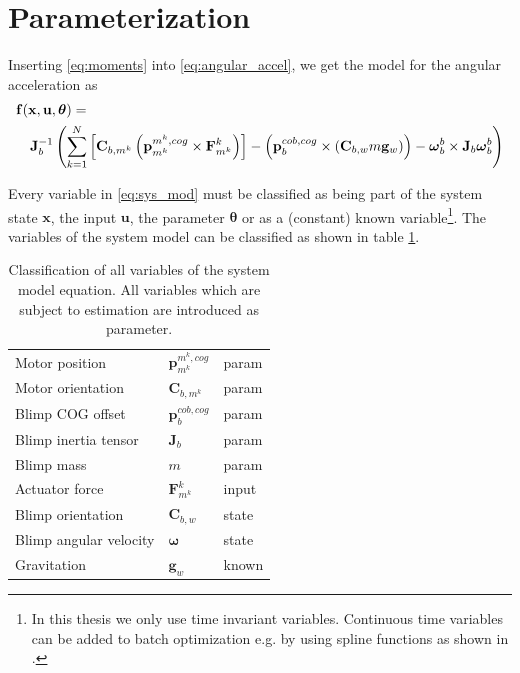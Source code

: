 \section{Parameterization}
\label{sec:parameterization}
Inserting \cref{eq:moments} into \cref{eq:angular_accel}, we get the model for the angular acceleration as
\begin{align}
\lefteqn{ \mathbf{f}(\mathbf{x}, \mathbf{u}, \boldsymbol{\theta}) = {} \label{eq:sys_mod} }\\
& & {} \mathbf{J}_b^{-1} \left( 
\sum_{k=1}^N  \left[  \mathbf{C}_{b,m^k} \left( \mathbf{p}^{m^k,cog}_{m^k} \times \mathbf{F}^k_{m^k} \right)  \right]
-
\left( \mathbf{p}^{cob,cog}_b \times (\mathbf{C}_{b,w}m\mathbf{g}_w) \right)
- \boldsymbol{\omega}_b^b \times \mathbf{J}_b \boldsymbol{\omega}_b^b \right) \nonumber
\end{align}

Every variable in \cref{eq:sys_mod} must be classified as being part of the system state $\mathbf{x}$, the input $\mathbf{u}$, the parameter $\boldsymbol{\theta}$ or as a (constant) known variable\footnote{In this thesis we only use time invariant variables.
Continuous time variables can be added to batch optimization e.g. by using spline functions as shown in \citep{Furgale2012}.}.
The variables of the system model can be classified as shown in table \ref{tab:params}.

\begin{table}[htb!]
\centering
\begin{tabular}{lll}
\hline
Motor position & $\mathbf{p}^{m^k,cog}_{m^k}$ 	& param \\
Motor orientation & $\mathbf{C}_{b,m^k}$ 		& param \\
Blimp COG offset & $\mathbf{p}^{cob,cog}_b$ 	& param \\
Blimp inertia tensor & $\mathbf{J}_b$ 			& param \\
Blimp mass & $m$ 								& param \\
Actuator force & $\mathbf{F}_{m^k}^k$ 			& input \\
Blimp orientation & $\mathbf{C}_{b,w}$ 			& state \\
Blimp angular velocity & $\boldsymbol{\omega}$ 	& state \\
Gravitation & $\mathbf{g}_w$ 					& known \\
\hline
\end{tabular}
\caption{Classification of all variables of the system model equation. All variables which are subject to estimation are introduced as parameter.}
\label{tab:params}
\end{table}

